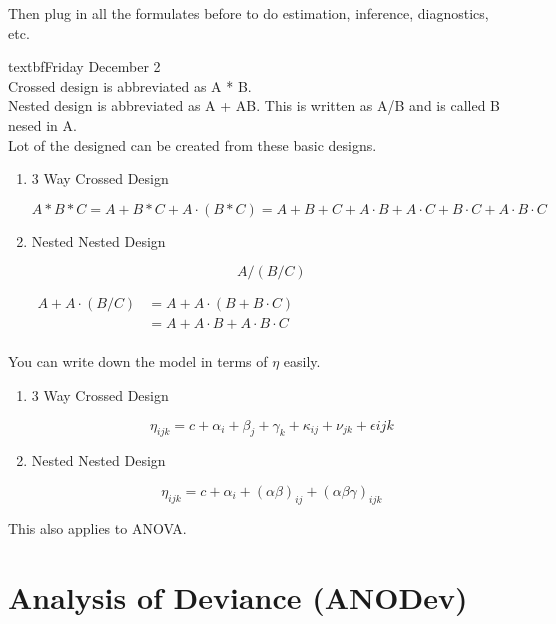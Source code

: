 \documentclass[11pt,fleqn]{book} %
\begin{document}
Then plug in all the formulates before to do estimation, inference, diagnostics, etc. 



textbf{Friday December 2}\\

Crossed design is abbreviated as A * B. \\

Nested design is abbreviated as A + AB. This is written as A/B and is called B nesed in A.\\

Lot of the designed can be created from these basic designs.\\


\begin{enumerate}
	\item 3 Way Crossed Design

			$$A * B * C = A + B*C + A\cdot(B*C) = A + B + C + A\cdot B + A\cdot C + B \cdot C + A\cdot B \cdot C$$ 
	\item Nested Nested Design

			$$ A/(B/C)$$

			$\begin{aligned}
			 	A + A\cdot(B/C) &= A + A \cdot(B + B\cdot C)\\
			 		&=A + A \cdot B + A\cdot B \cdot C\\			 	
			 \end{aligned}$ 
\end{enumerate}

You can write down the model in terms of $\eta$ easily. 

\begin{enumerate}
	\item 3 Way Crossed Design

			$$\eta_{ijk} = c + \alpha_i + \beta_j + \gamma_k + \kappa_{ij} + \nu_{jk} + \epsilon{ijk}$$

	\item Nested Nested Design

			$$\eta_{ijk} = c + \alpha_i + (\alpha \beta)_{ij} + (\alpha \beta \gamma)_{ijk}$$

		
\end{enumerate}

This also applies to ANOVA. 

\section{Analysis of Deviance (ANODev)}
\end{document}

